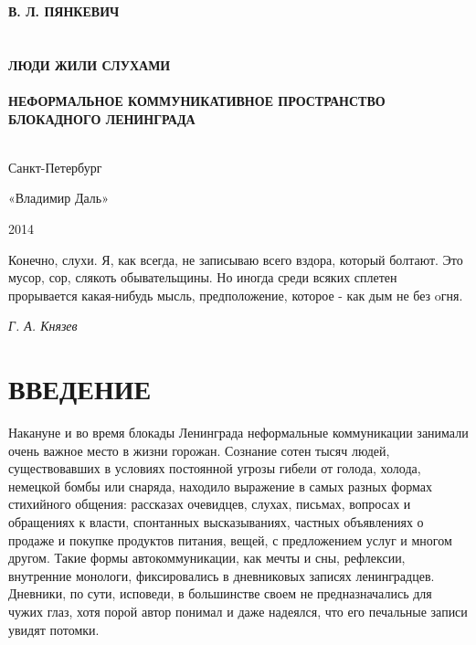 \documentclass[12pt, a4paper, openany]{book}
\begin{document}
\begin{titlepage}

\begin{center}
\vspace*{\fill}


{\large\bf В. Л. ПЯНКЕВИЧ\\}
\ \\
\ \\
{\Huge\bf ЛЮДИ ЖИЛИ СЛУХАМИ\\}
\ \\
{\Large \bf НЕФОРМАЛЬНОЕ КОММУНИКАТИВНОЕ ПРОСТРАНСТВО БЛОКАДНОГО ЛЕНИНГРАДА}
\ \\
\ \\
\vspace*{\fill}

\vfill


Санкт-Петербург

«Владимир Даль»

2014


\end{center}

\end{titlepage}

\thispagestyle{empty} %

\newpage


\setcounter{secnumdepth}{0}

\epigraph{Конечно, слухи. Я, как всегда, не записываю всего вздора, который болтают. Это мусор, сор, слякоть обывательщины. Но иногда среди всяких сплетен прорывается какая-нибудь мысль, предположение, которое - как дым не без oгня.}{\textit{Г. А. Князев}}

\section[Введение]{\center \textbf{ВВЕДЕНИЕ}}

Накануне и во время блокады Ленинграда неформальные коммуникации занимали очень важное место в жизни горожан. Сознание сотен тысяч людей, существовавших в условиях постоянной угрозы гибели от голода, холода, немецкой бомбы или снаряда, находило выражение в самых разных формах стихийного общения: рассказах очевидцев, слухах, письмах, вопросах и обращениях к власти, спонтанных высказываниях, частных объявлениях о продаже и покупке продуктов питания, вещей, с предложением услуг и многом другом. Такие формы автокоммуникации, как мечты и сны, рефлексии, внутренние монологи, фиксировались в дневниковых записях ленинградцев. Дневники, по сути, исповеди, в большинстве своем не предназначались для чужих глаз, хотя порой автор понимал и даже надеялся, что его печальные записи увидят потомки.
\end{document}
